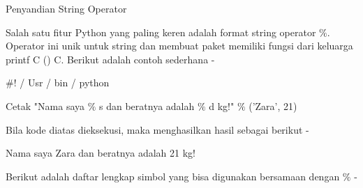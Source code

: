 \documentclass[a4paper,12pt]{report}
\begin{document}


\vspace{12pt}
\vspace{12pt}
\noindent 
Penyandian String Operator \par
\noindent 
Salah satu fitur Python yang paling keren adalah format string operator $  \%  $. Operator ini unik untuk string dan membuat paket memiliki fungsi dari keluarga printf C () C. Berikut adalah contoh sederhana - \par
\noindent 
 $  \#  $! / Usr / bin / python \par
\noindent 
\vspace{12pt}
\noindent 
Cetak "Nama saya $  \%  $ s dan beratnya adalah $  \%  $ d kg!"  $  \%  $ ('Zara', 21) \par
\noindent 
Bila kode diatas dieksekusi, maka menghasilkan hasil sebagai berikut - \par
\noindent 
Nama saya Zara dan beratnya adalah 21 kg! \par
\noindent 
Berikut adalah daftar lengkap simbol yang bisa digunakan bersamaan dengan $  \%  $ - \par
\noindent 
\vspace{12pt}


\end{document}
